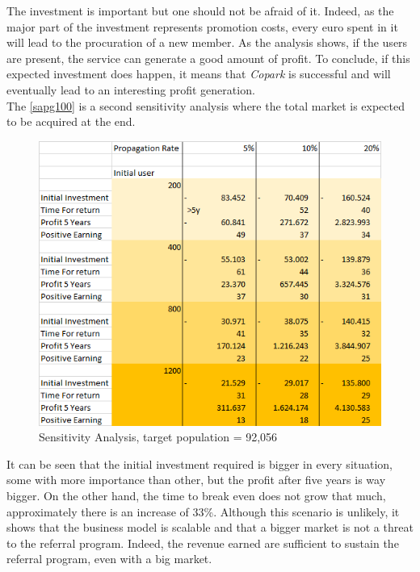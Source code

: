 \documentclass[12pt,a4paper,oneside]{book}
\newcommand{\bp}{\textit{Copark}}
\begin{document}
The investment is important but one should not be afraid of it. Indeed, as the major part of the investment represents promotion costs, every euro spent in it will lead to the procuration of a new member. As the analysis shows, if the users are present, the service can generate a good amount of profit. To conclude, if this expected investment does happen, it means that \bp{} is successful and will eventually lead to an interesting profit generation.\\

The \autoref{sapg100} is a second sensitivity analysis where the total market is expected to be acquired at the end.\\

\begin{figure}[h]
\centering
\caption{Sensitivity Analysis, target population = 92,056}
\label{sapg100}
\includegraphics[keepaspectratio=true,width=\textwidth-2cm]{../images/sensitivity100.png}
\end{figure}

It can be seen that the initial investment required is bigger in every situation, some with more importance than other, but the profit after five years is way bigger. On the other hand, the time to break even does not grow that much, approximately there is an increase of 33\%. Although this scenario is unlikely, it shows that the business model is scalable and that a bigger market is not a threat to the referral program. Indeed, the revenue earned are sufficient to sustain the referral program, even with a big market.
\end{document}
